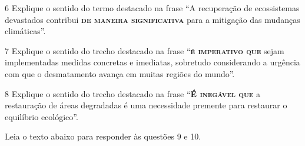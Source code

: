\num{6} Explique o sentido do termo destacado na frase ``A recuperação de
ecossistemas devastados contribui \textsc{\textbf{de maneira significativa}} para a mitigação das
mudanças climáticas''.

\num{7} Explique o sentido do trecho destacado na frase ``\textsc{\textbf{é imperativo que}} sejam 
implementadas medidas concretas e imediatas, sobretudo considerando a urgência com que o
desmatamento avança em muitas regiões do mundo''.

\num{8} Explique o sentido do trecho destacado na frase ``\textsc{\textbf{É
inegável que}} a restauração de áreas degradadas é uma necessidade premente
para restaurar o equilíbrio ecológico''.

Leia o texto abaixo para responder às questões 9 e 10.

